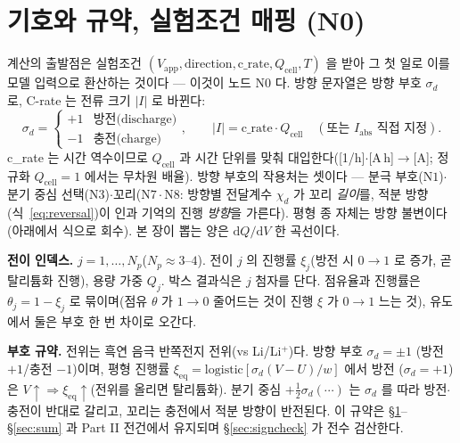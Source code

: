 \documentclass[11pt,a4paper]{article}
\newcommand{\dd}{\mathrm{d}}
\newcommand{\eq}{\mathrm{eq}}
\newcommand{\app}{\mathrm{app}}
\newcommand{\cell}{\mathrm{cell}}
\begin{document}
\tableofcontents
\newpage

\section{기호와 규약, 실험조건 매핑 (N0)}\label{sec:notation}
계산의 출발점은 실험조건 $(V_\app,\text{direction},\text{c\_rate},Q_\cell,T)$ 을 받아 그 첫 일로 이를 모델
입력으로 환산하는 것이다 — 이것이 노드 $\mathrm N0$ 다. 방향 문자열은 방향 부호 $\sigma_d$ 로,
C-rate 는 전류 크기 $|I|$ 로 바뀐다:
\begin{equation}
\sigma_d=\begin{cases}+1 & \text{방전(discharge)}\\ -1 & \text{충전(charge)}\end{cases},
\qquad
|I|=\text{c\_rate}\cdot Q_\cell\quad(\text{또는 }I_\mathrm{abs}\text{ 직접 지정}).
\label{eq:n0map}
\end{equation}
c\_rate 는 시간 역수이므로 $Q_\cell$ 과 시간 단위를 맞춰 대입한다([1/h]$\cdot$[A\,h]$\to$[A]; 정규화
$Q_\cell{=}1$ 에서는 무차원 배율). 방향 부호의 작용처는 셋이다 — 분극 부호($\mathrm N1$)$\cdot$분기 중심 선택($\mathrm N3$)$\cdot$꼬리($\mathrm N7\cdot\mathrm N8$:
방향별 전달계수 $\chi_d$ 가 꼬리 \emph{길이}를, 적분 방향(식~\eqref{eq:reversal})이 인과 기억의 진행 \emph{방향}을 가른다).
평형 종 자체는 방향 불변이다(아래에서 식으로 회수). 본 장이 뽑는 양은 $\dd Q/\dd V$ 한 곡선이다.

\textbf{전이 인덱스.} $j=1,\dots,N_p$($N_p\approx3$--$4$). 전이 $j$ 의 진행률 $\xi_j$(방전 시 $0\to1$ 로 증가, 곧 탈리튬화 진행),
용량 가중 $Q_j$. 박스 결과식은 $j$ 첨자를 단다. 점유율과 진행률은 $\theta_j=1-\xi_j$ 로 묶이며(점유 $\theta$ 가 $1\to0$
줄어드는 것이 진행 $\xi$ 가 $0\to1$ 느는 것), 유도에서 둘은 부호 한 번 차이로 오간다.

\textbf{부호 규약.} 전위는 흑연 음극 반쪽전지 전위(vs Li/Li$^+$)다. 방향 부호 $\sigma_d=\pm1$
(방전 $+1$/충전 $-1$)이며, 평형 진행률 $\xi_\eq=\mathrm{logistic}[\sigma_d(V-U)/w]$ 에서 방전
($\sigma_d=+1$)은 $V\!\uparrow\Rightarrow\xi_\eq\!\uparrow$(전위를 올리면 탈리튬화). 분기 중심 $+\tfrac12\sigma_d(\cdots)$
는 $\sigma_d$ 를 따라 방전$\cdot$충전이 반대로 갈리고, 꼬리는 충전에서 적분 방향이 반전된다. 이 규약은 \S\ref{sec:notation}--\S\ref{sec:sum}
과 Part II 전건에서 유지되며 \S\ref{sec:signcheck} 가 전수 검산한다.
\end{document}
